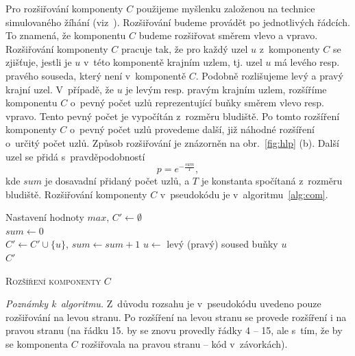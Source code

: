 \documentclass[a4paper,12pt]{article}
\begin{document}
Pro rozšiřování komponenty $C$ použijeme myšlenku založenou na technice simulovaného žíhání (viz~\cite{hrom}). Rozšiřování budeme provádět
po jednotlivých řádcích. To znamená, že komponentu $C$ budeme rozšiřovat směrem vlevo a vpravo. Rozšiřování komponenty $C$
pracuje tak, že pro každý uzel $u$ z~komponenty $C$ se zjišťuje, jestli je $u$ v~této komponentě krajním uzlem, tj.
uzel $u$ má levého resp. pravého souseda, který není v~komponentě $C$. Podobně rozlišujeme levý a pravý krajní uzel.
V~případě, že $u$ je levým resp. pravým krajním uzlem, rozšíříme komponentu $C$
o~pevný počet uzlů reprezentující buňky směrem vlevo resp. vpravo. Tento pevný počet je vypočítán z~rozměru bludiště.
Po tomto rozšíření komponenty $C$ o~pevný počet uzlů provedeme další, již náhodné rozšíření o~určitý počet uzlů. 
Způsob rozšiřování je znázorněn na obr.~\ref{fig:hlp} (b).
Další uzel se přidá s~pravděpodobností 
$$
  p = e^{-\frac{sum}{T}},
$$
kde $sum$ je dosavadní přidaný počet uzlů, a $T$ je konstanta spočítaná z~rozměru bludiště.
Rozšiřování komponenty $C$ v~pseudokódu je v~algoritmu~\ref{alg:com}.
 
\medskip

 \begin{algorithm}[H]
 \SetNlSty{}{}{:}
 \SetNlSkip{-1.0em}
 \SetInd{0.7em}{0.7em}
 \BlankLine
 \Indentp{1.7em}
   Nastavení hodnoty $max$, $C'\gets\emptyset$\\
   {
      $sum\gets 0$ \\
      {
	{
	   {
	    $C'\gets C'\cup \{u\}$, $sum\gets sum + 1$
	  }
	  $u\gets $ levý (pravý) soused buňky $u$ \\
	}
      }
   }
   \Return $C'$
 \caption{\textsc{Rozšíření komponenty $C$}}
 \label{alg:com}
\end{algorithm}

\textit{Poznámky k~algoritmu.} Z~důvodu rozsahu je v~pseudokódu uvedeno pouze rozšiřování na levou stranu. Po rozšíření na 
levou stranu se provede rozšíření i na pravou stranu (na řádku 15. by se znovu provedly řádky 4 -- 15, ale s~tím, že
by se komponenta $C$ rozšiřovala na pravou stranu -- kód v~závorkách).
\end{document}
